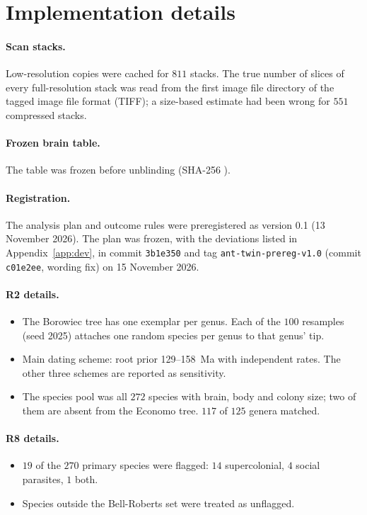 \section{Implementation details}\label{app:impl}

\paragraph{Scan stacks.} Low-resolution copies were cached for $811$ stacks. The true number of slices of every
full-resolution stack was read from the first image file directory of the tagged image file format (TIFF); a
size-based estimate had been wrong for $551$ compressed stacks.

\paragraph{Frozen brain table.} The table was frozen before unblinding (SHA-256
).

\paragraph{Registration.} The analysis plan and outcome rules were preregistered as version 0.1
(13 November 2026). The plan was frozen, with the deviations listed in Appendix~\ref{app:dev}, in commit
\texttt{3b1e350} and tag \texttt{ant-twin-prereg-v1.0} (commit \texttt{c01e2ee}, wording fix) on 15 November 2026.

\paragraph{R2 details.}
\begin{itemize}[nosep]
\item The Borowiec tree has one exemplar per genus. Each of the $100$ resamples (seed 2025) attaches one random species
per genus to that genus' tip.
\item Main dating scheme: root prior 129--158~Ma with independent rates. The other three schemes are reported as
sensitivity.
\item The species pool was all $272$ species with brain, body and colony size; two of them are absent from the Economo
tree. $117$ of $125$ genera matched.
\end{itemize}

\paragraph{R8 details.}
\begin{itemize}[nosep]
\item $19$ of the $270$ primary species were flagged: $14$ supercolonial, $4$ social parasites, $1$ both.
\item Species outside the Bell-Roberts set were treated as unflagged.
\end{itemize}

